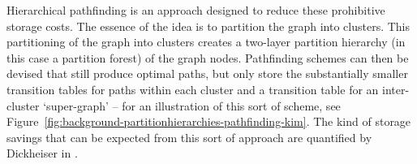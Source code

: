 
Hierarchical pathfinding is an approach designed to reduce these prohibitive storage costs. The essence of the idea is to partition the graph into clusters. This partitioning of the graph into clusters creates a two-layer partition hierarchy (in this case a partition forest) of the graph nodes. Pathfinding schemes can then be devised that still produce optimal paths, but only store the substantially smaller transition tables for paths within each cluster and a transition table for an inter-cluster `super-graph' -- for an illustration of this sort of scheme, see Figure~\ref{fig:background-partitionhierarchies-pathfinding-kim}. The kind of storage savings that can be expected from this sort of approach are quantified by Dickheiser in \cite{dickheiser04}.


